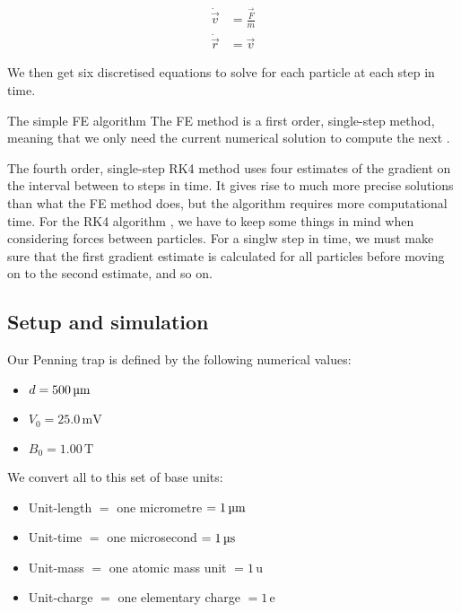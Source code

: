 \begin{equation}\label{eq:split_ODEs}
    \begin{split}
        \dot{\vec{v}} &= \frac{\vec{F}}{m} \\
        \dot{\vec{r}} &= \vec{v}
    \end{split}
\end{equation}

We then get six discretised equations to solve for each particle at each step in time.

The simple FE algorithm \citep{Arkinson1989}  The FE method is a first order, single-step method, meaning that we only need the current numerical solution to compute the next .

The fourth order, single-step RK4 method uses four estimates of the gradient on the interval between to steps in time. It gives rise to much more precise solutions than what the FE method does, but the algorithm requires more computational time. For the RK4 algorithm \citep{Arkinson1989}, we have to keep some things in mind when considering forces between particles. For a singlw step in time, we must make sure that the first gradient estimate is calculated for all particles before moving on to the second estimate, and so on. 


\subsection{Setup and simulation } 

Our Penning trap is defined by the following numerical values:

\begin{itemize}
    \item[] $d=500 \,\mathrm{\text{\textmu} m}$
    \item[] $V_0=25.0 \,\mathrm{mV}$
    \item[] $B_0=1.00 \,\mathrm{T}$
\end{itemize}

We convert all to this set of base units:

\begin{itemize}
    \item[] Unit-length $=$ one micrometre $= 1\, \mathrm{\text{\textmu}m} $ 
    \item[] Unit-time $=$ one microsecond $= 1\, \mathrm{\text{\textmu}s} $
    \item[] Unit-mass $=$ one atomic mass unit $= 1\, \mathrm{u} $
    \item[] Unit-charge $=$ one elementary charge $= 1\, \mathrm{e} $
\end{itemize}


